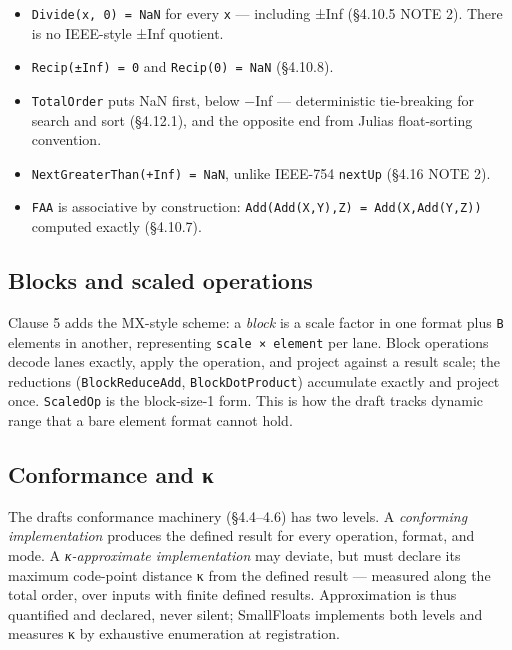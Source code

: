 \begin{itemize}
\item \texttt{Divide(x, 0) = NaN} for every \texttt{x} — including ±Inf (§4.10.5 NOTE 2). There is no IEEE-style ±Inf quotient.


\item \texttt{Recip(±Inf) = 0} and \texttt{Recip(0) = NaN} (§4.10.8).


\item \texttt{TotalOrder} puts NaN first, below −Inf — deterministic tie-breaking for search and sort (§4.12.1), and the opposite end from Julia{\textquotesingle}s float-sorting convention.


\item \texttt{NextGreaterThan(\allowbreak{}+Inf) = NaN}, unlike IEEE-754 \texttt{nextUp} (§4.16 NOTE 2).


\item \texttt{FAA} is associative by construction: \texttt{Add(\allowbreak{}Add(\allowbreak{}X,Y),Z) = Add(\allowbreak{}X,Add(\allowbreak{}Y,Z))} computed exactly (§4.10.7).

\end{itemize}


\subsection{Blocks and scaled operations}



\label{17754733778172498420}{}


Clause 5 adds the MX-style scheme: a \emph{block} is a scale factor in one format plus \texttt{B} elements in another, representing \texttt{scale × element} per lane. Block operations decode lanes exactly, apply the operation, and project against a result scale; the reductions (\texttt{BlockReduceAdd}, \texttt{BlockDotProduct}) accumulate exactly and project once. \texttt{ScaledOp} is the block-size-1 form. This is how the draft tracks dynamic range that a bare element format cannot hold.



\subsection{Conformance and κ}



\label{11385503936379929322}{}


The draft{\textquotesingle}s conformance machinery (§4.4–4.6) has two levels. A \emph{conforming implementation} produces the defined result for every operation, format, and mode. A \emph{κ-approximate implementation} may deviate, but must declare its maximum code-point distance κ from the defined result — measured along the total order, over inputs with finite defined results. Approximation is thus quantified and declared, never silent; SmallFloats implements both levels and measures κ by exhaustive enumeration at registration.



